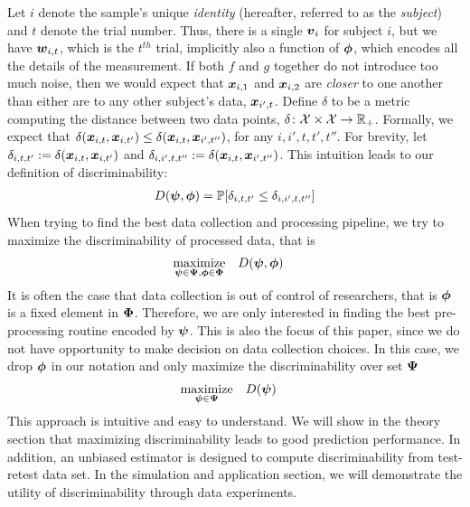 \documentclass{article}
\begin{document}
Let $i$ denote the sample's unique \emph{identity} (hereafter, referred to as the \emph{subject}) and $t$ denote the trial number.  Thus, there is a single $\boldsymbol{v}_i$ for subject $i$, but we have $\boldsymbol{w}_{i,t}$, which is the $t^{th}$ trial, implicitly also a function of $\boldsymbol{\phi}$, which encodes all the details of the measurement. If both $f$ and $g$ together do not introduce too much noise, then we would expect that $\boldsymbol{x}_{i,1}$ and $\boldsymbol{x}_{i,2}$ are \emph{closer} to one another than either are to any other subject's data, $\boldsymbol{x}_{i',t}$.  Define $\delta$ to be a metric computing the distance between two data points, $\delta {\ensuremath{\colon}} \mathcal{X} \times \mathcal{X} \to \mathbb{R}_+$.  Formally, we expect that $\delta(\boldsymbol{x}_{i,t},\boldsymbol{x}_{i,t'}) \leq \delta(\boldsymbol{x}_{i,t},\boldsymbol{x}_{i',t''})$, for any $i,i',t,t',t''$.  
For brevity, let $\delta_{i,t,t'}:=\delta(\boldsymbol{x}_{i,t}, \boldsymbol{x}_{i,t'})$ and 
$\delta_{i,i',t,t''}:=\delta(\boldsymbol{x}_{i,t}, \boldsymbol{x}_{i',t''})$.  
This intuition leads to our definition of discriminability:
\begin{align}
D(\boldsymbol{\psi},\boldsymbol{\phi}) = \mathbb{P}[ \delta_{i,t,t'} \leq \delta_{i,i',t,t''}]
\end{align}
When trying to find the best data collection and processing pipeline, we try to maximize the discriminability of processed data, that is  
\begin{equation} 
\begin{aligned}
& \underset{\boldsymbol{\psi} \in \boldsymbol{\Psi},\boldsymbol{\phi} \in \boldsymbol{\Phi}}{\text{maximize}}
& & D(\boldsymbol{\psi},\boldsymbol{\phi})
\end{aligned}
\end{equation}
It is often the case that data collection is out of control of researchers, that is $\boldsymbol{\phi}$ is a fixed element in $\boldsymbol{\Phi}$. Therefore, we are only interested in finding the best pre-processing routine encoded by $\boldsymbol{\psi}$. This is also the focus of this paper, since we do not have opportunity to make decision on data collection choices. In this case, we drop $\boldsymbol{\phi}$ in our notation and only maximize the discriminability over set $\boldsymbol{\Psi}$
\begin{equation} 
\begin{aligned}
& \underset{\boldsymbol{\psi} \in \boldsymbol{\Psi}}{\text{maximize}}
& & D(\boldsymbol{\psi})
\end{aligned}
\end{equation}
 This approach is intuitive and easy to understand. We will show in the theory section that maximizing discriminability leads to good prediction performance. In addition, an unbiased estimator is designed to compute discriminability from test-retest data set. In the simulation and application section, we will demonstrate the utility of discriminability through data experiments.
\end{document}

